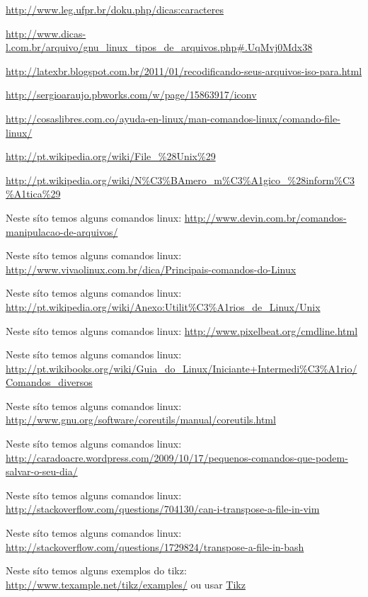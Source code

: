 \documentclass[a4paper,12pt,portuguese,oneside,final,notitlepage]{article}
\begin{document}
\begin{thebibliography}{99}

    \url{http://www.leg.ufpr.br/doku.php/dicas:caracteres}

    \url{http://www.dicas-l.com.br/arquivo/gnu_linux_tipos_de_arquivos.php#.UqMvj0Mdx38}

    \url{http://latexbr.blogspot.com.br/2011/01/recodificando-seus-arquivos-iso-para.html}
   
    \url{http://sergioaraujo.pbworks.com/w/page/15863917/iconv}
   
    \url{http://cosaslibres.com.co/ayuda-en-linux/man-comandos-linux/comando-file-linux/}
   
    \url{http://pt.wikipedia.org/wiki/File_%28Unix%29}
   
    \url{http://pt.wikipedia.org/wiki/N%C3%BAmero_m%C3%A1gico_%28inform%C3%A1tica%29}

    Neste síto temos alguns comandos linux:
   \url{http://www.devin.com.br/comandos-manipulacao-de-arquivos/}

    Neste síto temos alguns comandos linux:
   \url{http://www.vivaolinux.com.br/dica/Principais-comandos-do-Linux}

    Neste síto temos alguns comandos linux:
   \url{http://pt.wikipedia.org/wiki/Anexo:Utilit%C3%A1rios_de_Linux/Unix}

    Neste síto temos alguns comandos linux:
   \url{http://www.pixelbeat.org/cmdline.html}
   
    Neste síto temos alguns comandos linux:
   \url{http://pt.wikibooks.org/wiki/Guia_do_Linux/Iniciante+Intermedi%C3%A1rio/Comandos_diversos}
   
    Neste síto temos alguns comandos linux:
   \url{http://www.gnu.org/software/coreutils/manual/coreutils.html}
   
    Neste síto temos alguns comandos linux:
   \url{http://caradoacre.wordpress.com/2009/10/17/pequenos-comandos-que-podem-salvar-o-seu-dia/}

    Neste síto temos alguns comandos linux:
   \url{http://stackoverflow.com/questions/704130/can-i-transpose-a-file-in-vim}

    Neste síto temos alguns comandos linux:
   \url{http://stackoverflow.com/questions/1729824/transpose-a-file-in-bash}
   
    Neste síto temos alguns exemplos do tikz:
   \url{http://www.texample.net/tikz/examples/} ou usar \href{http://www.texample.net/tikz/examples/}{Tikz}
\end{thebibliography}
\end{document}
